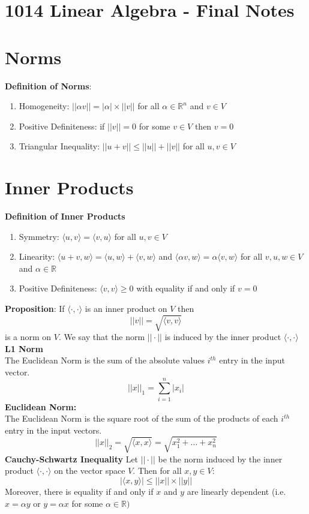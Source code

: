 \documentclass[12pt,twoside]{article}
\newcommand{\R}{\mathbb{R}}
\begin{document}
\section*{1014 Linear Algebra - Final Notes}

\section*{Norms}
\textbf{Definition of Norms}:
\begin{enumerate}
    \item Homogeneity: $||\alpha v|| = |\alpha| \times ||v||$ for all $\alpha \in \R^n$ and $v \in V$
    \item Positive Definiteness: if $||v|| = 0$ for some $v\in V$ then $v=0$
    \item Triangular Inequality: $||u+v|| \leq ||u|| + ||v|| $ for all $u,v \in V$
\end{enumerate}
\section*{Inner Products} 
\textbf{Definition of Inner Products} 
\begin{enumerate}
    \item Symmetry: $\langle u, v \rangle = \langle v, u \rangle$ for all $u,v \in V$
    \item Linearity: $\langle u+v, w \rangle = \langle u,w\rangle + \langle v,w\rangle$ and $\langle \alpha v , w\rangle = \alpha \langle v,w\rangle$ for all $v,u,w \in V$ and $\alpha \in \R$
    \item Positive Definiteness: $\langle v,v \rangle \geq 0$ with equality if and only if $v=0$
\end{enumerate}
\textbf{Proposition}:
If $\langle \cdot,\cdot \rangle $ is an inner product on $V$ then $$
    ||v|| = \sqrt{\langle v,v \rangle}
$$ is a norm on $V$. We say that the norm $||\cdot|| $ is induced by the inner product $\langle \cdot, \cdot \rangle$\\
\textbf{L1 Norm}\\
The Euclidean Norm is the sum of the absolute values $i^{th}$ entry in the input vector.
$$
    ||x||_1 = \sum_{i=1}^n |x_i|
$$
\textbf{Euclidean Norm:}\\
The Euclidean Norm is the square root of the sum of the products of each $i^{th}$ entry in the input vectors.
$$
    ||x||_2 = \sqrt{\langle x, x \rangle } = \sqrt{x_1^2 + \dots + x_n^2}
$$
\textbf{Cauchy-Schwartz Inequality}
Let $||\cdot||$ be the norm induced by the inner product $\langle \cdot, \cdot \rangle$ on the vector space $V$. Then for all $x,y \in V$:
$$
    |\langle x,y \rangle|  \leq ||x|| \times ||y||
    $$
Moreover, there is equality if and only if $x$ and $y$ are linearly dependent (i.e. $x=\alpha y$ or $y= \alpha x$ for some $\alpha \in \R)$
\end{document}

